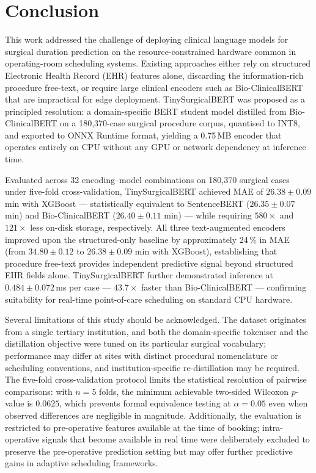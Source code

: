 \documentclass[3p]{elsarticle}
\begin{document}
\section{Conclusion}\label{sec:conclusion}

This work addressed the challenge of deploying clinical language models for surgical duration prediction on the resource-constrained hardware common in operating-room scheduling systems. Existing approaches either rely on structured Electronic Health Record (EHR) features alone, discarding the information-rich procedure free-text, or require large clinical encoders such as Bio-ClinicalBERT that are impractical for edge deployment. TinySurgicalBERT was proposed as a principled resolution: a domain-specific BERT student model distilled from Bio-ClinicalBERT on a 180{,}370-case surgical procedure corpus, quantised to INT8, and exported to ONNX Runtime format, yielding a 0.75\,MB encoder that operates entirely on CPU without any GPU or network dependency at inference time.

Evaluated across 32 encoding–model combinations on 180{,}370 surgical cases under five-fold cross-validation, TinySurgicalBERT achieved MAE of $26.38 \pm 0.09$ min with XGBoost — statistically equivalent to SentenceBERT ($26.35 \pm 0.07$ min) and Bio-ClinicalBERT ($26.40 \pm 0.11$ min) — while requiring $580\times$ and $121\times$ less on-disk storage, respectively. All three text-augmented encoders improved upon the structured-only baseline by approximately 24\,\% in MAE (from $34.80 \pm 0.12$ to $26.38 \pm 0.09$ min with XGBoost), establishing that procedure free-text provides independent predictive signal beyond structured EHR fields alone. TinySurgicalBERT further demonstrated inference at $0.484 \pm 0.072$\,ms per case — $43.7\times$ faster than Bio-ClinicalBERT — confirming suitability for real-time point-of-care scheduling on standard CPU hardware.

Several limitations of this study should be acknowledged. The dataset originates from a single tertiary institution, and both the domain-specific tokeniser and the distillation objective were tuned on its particular surgical vocabulary; performance may differ at sites with distinct procedural nomenclature or scheduling conventions, and institution-specific re-distillation may be required. The five-fold cross-validation protocol limits the statistical resolution of pairwise comparisons: with $n = 5$ folds, the minimum achievable two-sided Wilcoxon $p$-value is $0.0625$, which prevents formal equivalence testing at $\alpha = 0.05$ even when observed differences are negligible in magnitude. Additionally, the evaluation is restricted to pre-operative features available at the time of booking; intra-operative signals that become available in real time were deliberately excluded to preserve the pre-operative prediction setting but may offer further predictive gains in adaptive scheduling frameworks.
\end{document}
